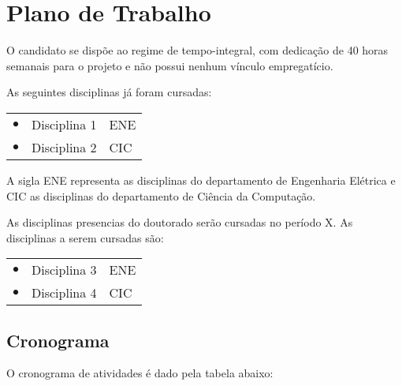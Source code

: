 \chapter{Plano de Trabalho}

O candidato se dispõe ao regime de tempo-integral, com dedicação de 40 horas semanais para o projeto e não possui nenhum vínculo empregatício.

As seguintes disciplinas já foram cursadas:

\vspace{0.2cm}
\begin{tabular}{r m{8cm} l}
	$\bullet$ & Disciplina 1 & ENE \\
	$\bullet$ & Disciplina 2 & CIC \\
\end{tabular}
\vspace{0.4cm}

A sigla ENE representa as disciplinas do departamento de Engenharia Elétrica e CIC as disciplinas do departamento de Ciência da Computação.

As disciplinas presencias do doutorado serão cursadas no período X. As disciplinas a serem cursadas são:

\vspace{0.2cm}
\begin{tabular}{r m{8cm} l}
	$\bullet$ & Disciplina 3 & ENE \\
	$\bullet$ & Disciplina 4 & CIC \\
\end{tabular}
\vspace{0.4cm}

\newpage
\section{Cronograma}

O cronograma de atividades é dado pela tabela abaixo:

